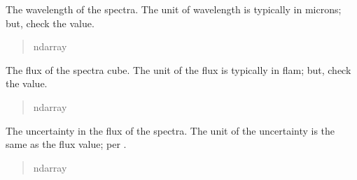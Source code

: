 \documentclass[letterpaper,11pt,english]{sphinxmanual}
\begin{document}
\begin{savenotes}
\begin{fulllineitems}
\begin{savenotes}\begin{fulllineitems}
\label{\detokenize{code/lezargus.container.cube:lezargus.container.cube.LezargusCube.wavelength}}
\pysigstartsignatures
{}
\pysigstopsignatures
\sphinxAtStartPar
The wavelength of the spectra. The unit of wavelength is typically
in microns; but, check the  value.
\begin{quote}\begin{description}
\sphinxAtStartPar
ndarray

\end{description}\end{quote}

\end{fulllineitems}\end{savenotes}


\begin{savenotes}\begin{fulllineitems}
\label{\detokenize{code/lezargus.container.cube:lezargus.container.cube.LezargusCube.data}}
\pysigstartsignatures
{}
\pysigstopsignatures
\sphinxAtStartPar
The flux of the spectra cube. The unit of the flux is typically
in flam; but, check the  value.
\begin{quote}\begin{description}
\sphinxAtStartPar
ndarray

\end{description}\end{quote}

\end{fulllineitems}\end{savenotes}


\begin{savenotes}\begin{fulllineitems}
\label{\detokenize{code/lezargus.container.cube:lezargus.container.cube.LezargusCube.uncertainty}}
\pysigstartsignatures
{}
\pysigstopsignatures
\sphinxAtStartPar
The uncertainty in the flux of the spectra. The unit of the uncertainty
is the same as the flux value; per .
\begin{quote}\begin{description}
\sphinxAtStartPar
ndarray


\end{description}
\end{quote}
\end{fulllineitems}
\end{savenotes}
\end{fulllineitems}
\end{savenotes}
\end{document}
